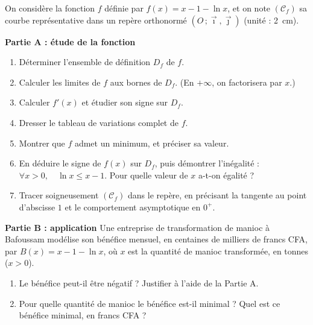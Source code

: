 \documentclass[11pt]{article}
\begin{document}
\begin{exercice}
On considère la fonction $f$ définie par $f(x)=x-1-\ln x$, et on note $(\mathcal{C}_f)$ sa courbe représentative dans un repère orthonormé $(O\,;\vec{\imath},\vec{\jmath})$ (unité : \SI{2}{cm}).

\textbf{Partie A : étude de la fonction}
\begin{enumerate}
\item Déterminer l'ensemble de définition $D_f$ de $f$.
\item Calculer les limites de $f$ aux bornes de $D_f$. (En $+\infty$, on factorisera par $x$.)
\item Calculer $f'(x)$ et étudier son signe sur $D_f$.
\item Dresser le tableau de variations complet de $f$.
\item Montrer que $f$ admet un minimum, et préciser sa valeur.
\item En déduire le signe de $f(x)$ sur $D_f$, puis démontrer l'inégalité : $\forall x>0,\quad \ln x \leq x-1$. Pour quelle valeur de $x$ a-t-on égalité ?
\item Tracer soigneusement $(\mathcal{C}_f)$ dans le repère, en précisant la tangente au point d'abscisse $1$ et le comportement asymptotique en $0^+$.
\end{enumerate}

\textbf{Partie B : application}
Une entreprise de transformation de manioc à Bafoussam modélise son bénéfice mensuel, en centaines de milliers de francs CFA, par $B(x)=x-1-\ln x$, où $x$ est la quantité de manioc transformée, en tonnes ($x>0$).
\begin{enumerate}
\item Le bénéfice peut-il être négatif ? Justifier à l'aide de la Partie A.
\item Pour quelle quantité de manioc le bénéfice est-il minimal ? Quel est ce bénéfice minimal, en francs CFA ?
\end{enumerate}
\end{exercice}
\end{document}

